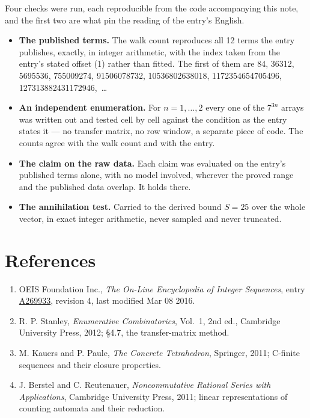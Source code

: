 \documentclass[11pt]{article}
\theoremstyle{definition}
\begin{document}
Four checks were run, each reproducible from the code accompanying this note, and the first two are what pin the reading of the entry's English.

\begin{itemize}

\item {\bfseries The published terms.} The walk count reproduces all 12 terms the entry publishes, exactly, in integer arithmetic, with the index taken from the entry's stated offset (1) rather than fitted. The first of them are 84, 36312, 5695536, 755009274, 91506078732, 10536802638018, 1172354654705496, 127313882431172946,~\dots

\item {\bfseries An independent enumeration.} For $n = 1,\dots,2$ every one of the $7^{3n}$ arrays was written out and tested cell by cell against the condition as the entry states it --- no transfer matrix, no row window, a separate piece of code. The counts agree with the walk count and with the entry.

\item {\bfseries The claim on the raw data.} Each claim was evaluated on the entry's published terms alone, with no model involved, wherever the proved range and the published data overlap. It holds there.

\item {\bfseries The annihilation test.} Carried to the derived bound $S = 25$ over the whole vector, in exact integer arithmetic, never sampled and never truncated.

\end{itemize}

\section{References}

\begin{enumerate}

\item OEIS Foundation Inc., \emph{The On-Line Encyclopedia of Integer Sequences}, entry \href{https://oeis.org/A269933}{A269933}, revision 4, last modified Mar 08 2016.

\item R. P. Stanley, \emph{Enumerative Combinatorics}, Vol.~1, 2nd ed., Cambridge University Press, 2012; \S4.7, the transfer-matrix method.

\item M. Kauers and P. Paule, \emph{The Concrete Tetrahedron}, Springer, 2011; C-finite sequences and their closure properties.

\item J. Berstel and C. Reutenauer, \emph{Noncommutative Rational Series with Applications}, Cambridge University Press, 2011; linear representations of counting automata and their reduction.

\end{enumerate}
\end{document}

